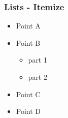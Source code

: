 \label{itemize}
\begin{frame}\frametitle{Lists - Itemize}
  \begin{itemize}
    \item Point A
    \item Point B
    \begin{itemize}
      \item part 1
      \item part 2
    \end{itemize}
    \item Point C
    \item Point D
  \end{itemize}
\end{frame}



